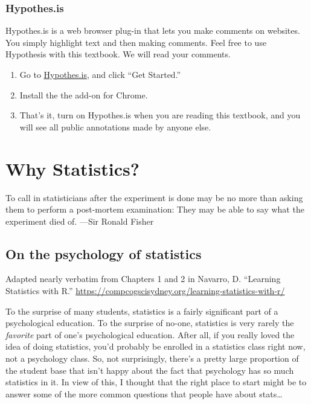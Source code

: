 \documentclass[
]{book}
\begin{document}
\subsection{Hypothes.is}\label{hypothes.is}

Hypothes.is is a web browser plug-in that lets you make comments on websites. You simply highlight text and then making comments. Feel free to use Hypothesis with this textbook. We will read your comments.

\begin{enumerate}
\def\labelenumi{\alph{enumi}.}
\item
  Go to \href{https://web.hypothes.is/}{Hypothes.is}, and click ``Get Started.''
\item
  Install the the add-on for Chrome.
\item
  That's it, turn on Hypothes.is when you are reading this textbook, and you will see all public annotations made by anyone else.
\end{enumerate}

\chapter{Why Statistics?}\label{why-statistics}

{
To call in statisticians after the experiment is done may be no more than asking them to perform a post-mortem examination: They may be able to say what the experiment died of.
---Sir Ronald Fisher
}

\section{On the psychology of statistics}\label{on-the-psychology-of-statistics}

Adapted nearly verbatim from Chapters 1 and 2 in Navarro, D. ``Learning Statistics with R.'' \url{https://compcogscisydney.org/learning-statistics-with-r/}

To the surprise of many students, statistics is a fairly significant part of a psychological education. To the surprise of no-one, statistics is very rarely the \emph{favorite} part of one's psychological education. After all, if you really loved the idea of doing statistics, you'd probably be enrolled in a statistics class right now, not a psychology class. So, not surprisingly, there's a pretty large proportion of the student base that isn't happy about the fact that psychology has so much statistics in it. In view of this, I thought that the right place to start might be to answer some of the more common questions that people have about stats\ldots{}
\end{document}
